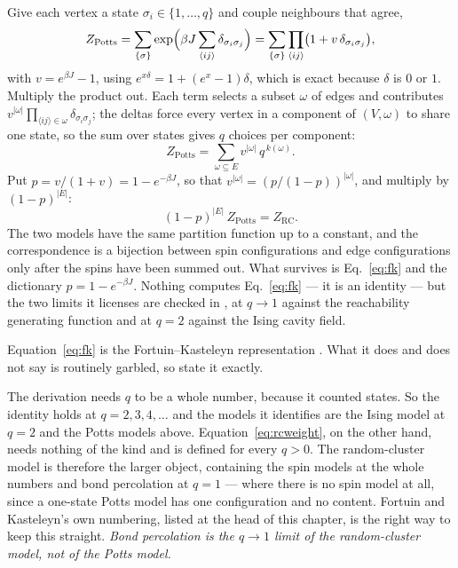 Give each vertex a state $\sigma_i\in\{1,\dots,q\}$ and couple neighbours that
agree,
\[
  Z_{\mathrm{Potts}}
   =\sum_{\{\sigma\}}\exp\Bigl(\beta J\sum_{\langle ij\rangle}
     \delta_{\sigma_i\sigma_j}\Bigr)
   =\sum_{\{\sigma\}}\prod_{\langle ij\rangle}
     \bigl(1+v\,\delta_{\sigma_i\sigma_j}\bigr),
\]
with $v=e^{\beta J}-1$, using $e^{x\delta}=1+(e^{x}-1)\delta$, which is exact
because $\delta$ is $0$ or $1$. Multiply the product out. Each term selects a subset $\omega$ of edges and
contributes $v^{|\omega|}\prod_{\langle ij\rangle\in\omega}
\delta_{\sigma_i\sigma_j}$; the deltas force every vertex in a component of
$(V,\omega)$ to share one state, so the sum over states gives $q$ choices per
component:
\[
  Z_{\mathrm{Potts}}=\sum_{\omega\subseteq E}v^{|\omega|}\,q^{\,k(\omega)}.
\]
Put $p=v/(1+v)=1-e^{-\beta J}$, so that $v^{|\omega|}=(p/(1-p))^{|\omega|}$, and
multiply by $(1-p)^{|E|}$:
\begin{equation}
  (1-p)^{|E|}\,Z_{\mathrm{Potts}}=Z_{\mathrm{RC}}.
  \label{eq:fk}
\end{equation}
The two models have the same partition function up to a constant, and the
correspondence is a bijection between spin configurations and edge
configurations only after the spins have been summed out. What survives is
Eq.~\eqref{eq:fk} and the dictionary $p=1-e^{-\beta J}$. Nothing computes Eq.~\eqref{eq:fk} --- it is an identity --- but the two limits it licenses are checked in , at $q\to1$ against the reachability generating function and at $q=2$ against the Ising cavity field.

Equation~\eqref{eq:fk} is the Fortuin--Kasteleyn representation
\citep{fortuin1972}. What it does and does not say is routinely garbled, so
state it exactly.

The derivation needs $q$ to be a whole number, because it counted states. So
the identity holds at $q=2,3,4,\dots$ and the models it identifies are the
Ising model at $q=2$ and the Potts models above. Equation~\eqref{eq:rcweight},
on the other hand, needs nothing of the kind and is defined for every $q>0$.
The random-cluster model is therefore the larger object, containing the spin
models at the whole numbers and bond percolation at $q=1$ --- where there is no
spin model at all, since a one-state Potts model has one configuration and no
content. Fortuin and Kasteleyn's own numbering, listed at the head of this
chapter, is the right way to keep this straight. \emph{Bond percolation is the
$q\to1$ limit of the random-cluster model, not of the Potts model.}


